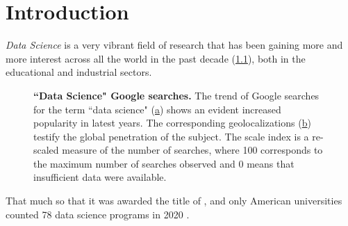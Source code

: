\chapter{Introduction}
\label{chap:introduction}


\textit{Data Science} is a very vibrant field of research that has been gaining more and more interest across all the world in the past decade (\cref{fig:GoogleTrendsDS}), both in the educational and industrial sectors.
\begin{figure}
\centering
{}

\caption{
\textbf{``Data Science" Google searches.} 
The trend of Google searches for the term ``data science" (\hyperref[fig:GoogleTrendsDS:ts]{a}) shows an evident increased popularity in latest years. The corresponding geolocalizations (\hyperref[fig:GoogleTrendsDS:map]{b}) testify the global penetration of the subject. The scale index is a re-scaled measure of the number of searches, where 100 corresponds to the maximum number of searches observed and 0 means that insufficient data were available.
} 
\label{fig:GoogleTrendsDS}
\end{figure}
That much so that it was awarded the title of  \cite{davenport2012sexiest}, and only American universities counted 78 data science programs in 2020 \cite{zhang2021data}.

